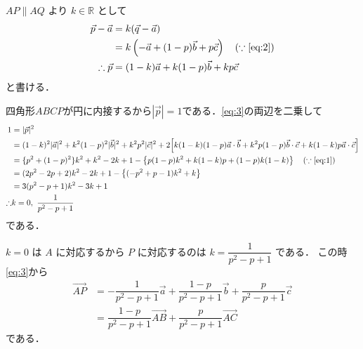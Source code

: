\documentclass[../../main.tex]{subfiles}
\begin{document}
$AP \parallel AQ$ より $k \in \mathbb{R}$ として
\begin{align}
  \vec{p} - \vec{a}
  & = k(\vec{q}-\vec{a}) \\
  & = k\left(-\vec{a} + (1-p)\vec{b} + p\vec{c}\right) \quad (\because\text{\cref{eq:2}}) \\
  \therefore
  \vec{p} &= (1-k)\vec{a} + k(1-p)\vec{b} + kp\vec{c} \label{eq:3}
\end{align}
と書ける．

四角形$ABCP$が円に内接するから$|\vec{p}|=1$である．\cref{eq:3}の両辺を二乗して
\begin{align}
  1
  &= |\vec{p}|^2 \\
  &= (1-k)^2|\vec{a}|^2 + k^2(1-p)^2|\vec{b}|^2 + k^2p^2|\vec{c}|^2 + 2\Bigl[k(1-k)(1-p)\vec{a}\cdot\vec{b} + k^2p(1-p)\vec{b}\cdot\vec{c} + k(1-k)p\vec{a}\cdot\vec{c}\Bigr] \\
  &= \{p^2+(1-p)^2\}k^2 + k^2 - 2k + 1 - \left\{p(1-p)k^2 + k(1-k)p + (1-p)k(1-k)\right\} \quad (\because\text{\cref{eq:1}})\\
  &= (2p^2-2p+2)k^2 - 2k + 1 - \left\{(-p^2+p-1)k^2 + k\right\} \\
  &= 3(p^2-p+1)k^2 - 3k + 1 \\
  \therefore
  & k=0, \ \dfrac{1}{p^2-p+1} \label{eq:4}
\end{align}
である．

$k=0$ は $A$ に対応するから $P$ に対応するのは $k = \dfrac{1}{p^2-p+1}$ である．
この時\cref{eq:3}から
\begin{align}
  \overrightarrow{AP}
  &= -\dfrac{1}{p^2-p+1}\vec{a} + \dfrac{1-p}{p^2-p+1}\vec{b} + \dfrac{p}{p^2-p+1}\vec{c} \\
  &= \dfrac{1-p}{p^2-p+1}\overrightarrow{AB} + \dfrac{p}{p^2-p+1}\overrightarrow{AC}
\end{align}
である．
\end{document}
